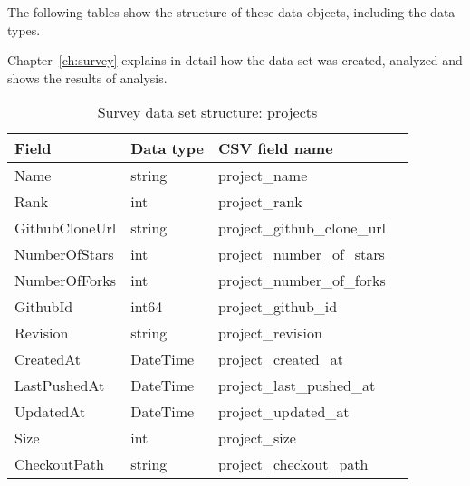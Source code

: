         The following tables show the structure of these data objects, including the data types.

        Chapter~\ref{ch:survey} explains in detail how the data set was created, analyzed and shows the results of analysis.

        \begin{table}[h]
            \centering
            \caption{Survey data set structure: projects}
            \label{tbl:datastructure-projects}
            \begin{tabular}{llll}
                \toprule
                Field & Data type & CSV field name \\
                \midrule
                Name           & string   & project\_name \\
                Rank           & int      & project\_rank \\
                GithubCloneUrl & string   & project\_github\_clone\_url \\
                NumberOfStars  & int      & project\_number\_of\_stars \\
                NumberOfForks  & int      & project\_number\_of\_forks \\
                GithubId       & int64    & project\_github\_id \\
                Revision       & string   & project\_revision \\
                CreatedAt      & DateTime & project\_created\_at \\
                LastPushedAt   & DateTime & project\_last\_pushed\_at \\
                UpdatedAt      & DateTime & project\_updated\_at \\
                Size           & int      & project\_size \\
                CheckoutPath   & string   & project\_checkout\_path \\
                \bottomrule
            \end{tabular}
        \end{table}

